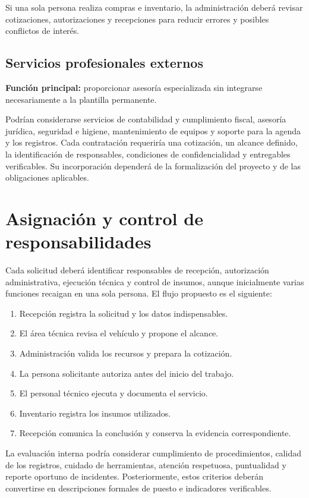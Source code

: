 \documentclass[12pt,letterpaper,oneside]{article}
\begin{document}
Si una sola persona realiza compras e inventario, la administración deberá revisar cotizaciones, autorizaciones y recepciones para reducir errores y posibles conflictos de interés.

\subsection{Servicios profesionales externos}

\textbf{Función principal:} proporcionar asesoría especializada sin integrarse necesariamente a la plantilla permanente.

Podrían considerarse servicios de contabilidad y cumplimiento fiscal, asesoría jurídica, seguridad e higiene, mantenimiento de equipos y soporte para la agenda y los registros. Cada contratación requeriría una cotización, un alcance definido, la identificación de responsables, condiciones de confidencialidad y entregables verificables. Su incorporación dependerá de la formalización del proyecto y de las obligaciones aplicables.

\section{Asignación y control de responsabilidades}

Cada solicitud deberá identificar responsables de recepción, autorización administrativa, ejecución técnica y control de insumos, aunque inicialmente varias funciones recaigan en una sola persona. El flujo propuesto es el siguiente:

\begin{enumerate}
    \item Recepción registra la solicitud y los datos indispensables.
    \item El área técnica revisa el vehículo y propone el alcance.
    \item Administración valida los recursos y prepara la cotización.
    \item La persona solicitante autoriza antes del inicio del trabajo.
    \item El personal técnico ejecuta y documenta el servicio.
    \item Inventario registra los insumos utilizados.
    \item Recepción comunica la conclusión y conserva la evidencia correspondiente.
\end{enumerate}

La evaluación interna podría considerar cumplimiento de procedimientos, calidad de los registros, cuidado de herramientas, atención respetuosa, puntualidad y reporte oportuno de incidentes. Posteriormente, estos criterios deberán convertirse en descripciones formales de puesto e indicadores verificables.
\end{document}
